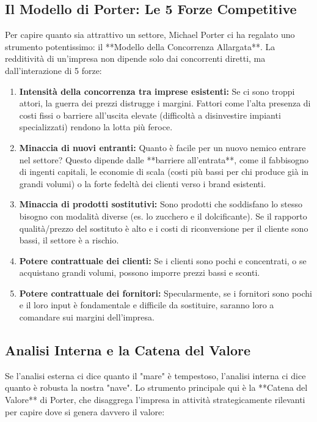 \documentclass[a4paper,10pt]{article}
\begin{document}
\subsection*{Il Modello di Porter: Le 5 Forze Competitive}

Per capire quanto sia attrattivo un settore, Michael Porter ci ha regalato uno strumento potentissimo: il **Modello della Concorrenza Allargata**. La redditività di un'impresa non dipende solo dai concorrenti diretti, ma dall'interazione di 5 forze:

\begin{enumerate}
    \item \textbf{Intensità della concorrenza tra imprese esistenti:} Se ci sono troppi attori, la guerra dei prezzi distrugge i margini. Fattori come l'alta presenza di costi fissi o barriere all'uscita elevate (difficoltà a disinvestire impianti specializzati) rendono la lotta più feroce.
    \item \textbf{Minaccia di nuovi entranti:} Quanto è facile per un nuovo nemico entrare nel settore? Questo dipende dalle **barriere all'entrata**, come il fabbisogno di ingenti capitali, le economie di scala (costi più bassi per chi produce già in grandi volumi) o la forte fedeltà dei clienti verso i brand esistenti.
    \item \textbf{Minaccia di prodotti sostitutivi:} Sono prodotti che soddisfano lo stesso bisogno con modalità diverse (es. lo zucchero e il dolcificante). Se il rapporto qualità/prezzo del sostituto è alto e i costi di riconversione per il cliente sono bassi, il settore è a rischio.
    \item \textbf{Potere contrattuale dei clienti:} Se i clienti sono pochi e concentrati, o se acquistano grandi volumi, possono imporre prezzi bassi e sconti.
    \item \textbf{Potere contrattuale dei fornitori:} Specularmente, se i fornitori sono pochi e il loro input è fondamentale e difficile da sostituire, saranno loro a comandare sui margini dell'impresa.
\end{enumerate}

\subsection*{Analisi Interna e la Catena del Valore}

Se l'analisi esterna ci dice quanto il "mare" è tempestoso, l'analisi interna ci dice quanto è robusta la nostra "nave". Lo strumento principale qui è la **Catena del Valore** di Porter, che disaggrega l'impresa in attività strategicamente rilevanti per capire dove si genera davvero il valore:
\end{document}
